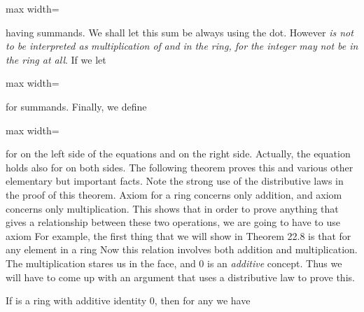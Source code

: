 \documentclass[11pt,oneside]{article}
\begin{document}
\begin{BookBody}
\begin{center}\begin{adjustbox}{max width=\linewidth}\end{adjustbox}\end{center}

\noindent having  summands. We shall let this sum be  always using the dot. However \textit{is not to be interpreted as}  \textit{multiplication of}  \textit{and}  \textit{in the ring, for the integer}  \textit{may} \textit{not be in the ring at all}. If  we let

\begin{center}\begin{adjustbox}{max width=\linewidth}\end{adjustbox}\end{center}

\noindent for  summands. Finally, we define

\begin{center}\begin{adjustbox}{max width=\linewidth}\end{adjustbox}\end{center}

\noindent for  on the left side of the equations and  on the right side. Actually, the equation  holds also for  on both sides. The following theorem proves this and various other elementary but important facts. Note the strong use of the distributive laws in the proof of this theorem. Axiom  for a ring concerns only addition, and axiom  concerns only multiplication. This shows that in order to prove anything that gives a relationship between these two operations, we are going to have to use axiom  For example, the first thing that we will show in Theorem 22.8 is that  for any element  in a ring  Now this relation involves both addition and multiplication. The multiplication  stares us in the face, and 0 is an\textit{ additive} concept. Thus we will have to come up with an argument that uses a distributive law to prove this.

 If  is a ring with additive identity 0, then for any  we have




\end{BookBody}
\end{document}
